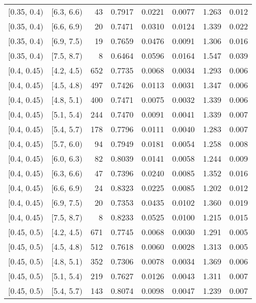 \begin{longtable}{| l | l | r | r | r | r | r | r |}
        $[$0.35, 0.4$)$ & $[$6.3, 6.6$)$ & 43 & 0.7917 & 0.0221 & 0.0077 & 1.263 & 0.012 \\
        $[$0.35, 0.4$)$ & $[$6.6, 6.9$)$ & 20 & 0.7471 & 0.0310 & 0.0124 & 1.339 & 0.022 \\
        $[$0.35, 0.4$)$ & $[$6.9, 7.5$)$ & 19 & 0.7659 & 0.0476 & 0.0091 & 1.306 & 0.016 \\
        $[$0.35, 0.4$)$ & $[$7.5, 8.7$)$ & 8 & 0.6464 & 0.0596 & 0.0164 & 1.547 & 0.039 \\
        $[$0.4, 0.45$)$ & $[$4.2, 4.5$)$ & 652 & 0.7735 & 0.0068 & 0.0034 & 1.293 & 0.006 \\
        $[$0.4, 0.45$)$ & $[$4.5, 4.8$)$ & 497 & 0.7426 & 0.0113 & 0.0031 & 1.347 & 0.006 \\
        $[$0.4, 0.45$)$ & $[$4.8, 5.1$)$ & 400 & 0.7471 & 0.0075 & 0.0032 & 1.339 & 0.006 \\
        $[$0.4, 0.45$)$ & $[$5.1, 5.4$)$ & 244 & 0.7470 & 0.0091 & 0.0041 & 1.339 & 0.007 \\
        $[$0.4, 0.45$)$ & $[$5.4, 5.7$)$ & 178 & 0.7796 & 0.0111 & 0.0040 & 1.283 & 0.007 \\
        $[$0.4, 0.45$)$ & $[$5.7, 6.0$)$ & 94 & 0.7949 & 0.0181 & 0.0054 & 1.258 & 0.008 \\
        $[$0.4, 0.45$)$ & $[$6.0, 6.3$)$ & 82 & 0.8039 & 0.0141 & 0.0058 & 1.244 & 0.009 \\
        $[$0.4, 0.45$)$ & $[$6.3, 6.6$)$ & 47 & 0.7396 & 0.0240 & 0.0085 & 1.352 & 0.016 \\
        $[$0.4, 0.45$)$ & $[$6.6, 6.9$)$ & 24 & 0.8323 & 0.0225 & 0.0085 & 1.202 & 0.012 \\
        $[$0.4, 0.45$)$ & $[$6.9, 7.5$)$ & 20 & 0.7353 & 0.0435 & 0.0102 & 1.360 & 0.019 \\
        $[$0.4, 0.45$)$ & $[$7.5, 8.7$)$ & 8 & 0.8233 & 0.0525 & 0.0100 & 1.215 & 0.015 \\
        $[$0.45, 0.5$)$ & $[$4.2, 4.5$)$ & 671 & 0.7745 & 0.0068 & 0.0030 & 1.291 & 0.005 \\
        $[$0.45, 0.5$)$ & $[$4.5, 4.8$)$ & 512 & 0.7618 & 0.0060 & 0.0028 & 1.313 & 0.005 \\
        $[$0.45, 0.5$)$ & $[$4.8, 5.1$)$ & 352 & 0.7306 & 0.0078 & 0.0034 & 1.369 & 0.006 \\
        $[$0.45, 0.5$)$ & $[$5.1, 5.4$)$ & 219 & 0.7627 & 0.0126 & 0.0043 & 1.311 & 0.007 \\
        $[$0.45, 0.5$)$ & $[$5.4, 5.7$)$ & 143 & 0.8074 & 0.0098 & 0.0047 & 1.239 & 0.007 \\

\end{longtable}
